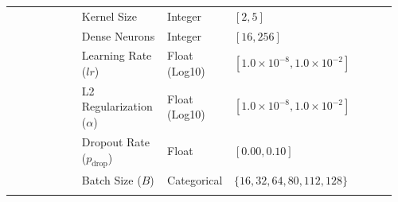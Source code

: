 \begin{table}[htbp]
\begin{tabularx}{\textwidth}{@{}p{0.18\linewidth} p{0.22\linewidth} p{0.14\linewidth} p{0.42\linewidth}@{}}
  & Kernel Size & Integer & $[2, 5]$ \\
  & Dense Neurons & Integer & $[16, 256]$ \\
  & Learning Rate ($lr$) & Float (Log10) & $[1.0 \times 10^{-8}, 1.0 \times 10^{-2}]$ \\
  & L2 Regularization ($\alpha$) & Float (Log10) & $[1.0 \times 10^{-8}, 1.0 \times 10^{-2}]$ \\
  & Dropout Rate ($p_{\text{drop}}$) & Float & $[0.00, 0.10]$ \\
  & Batch Size ($B$) & Categorical & $\{16, 32, 64, 80, 112, 128\}$ \\
\botrule
\end{tabularx}
\end{table}
